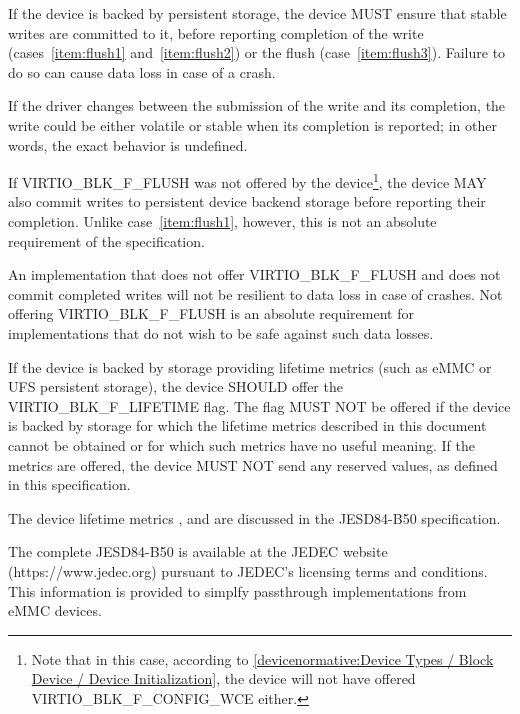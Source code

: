 If the device is backed by persistent storage, the device MUST ensure that
stable writes are committed to it, before reporting completion of the write
(cases~\ref{item:flush1} and~\ref{item:flush2}) or the flush
(case~\ref{item:flush3}).  Failure to do so can cause data loss
in case of a crash.

If the driver changes  between the submission of the write
and its completion, the write could be either volatile or stable when
its completion is reported; in other words, the exact behavior is undefined.

%

If VIRTIO_BLK_F_FLUSH was not offered by the
  device\footnote{Note that in this case, according to
  \ref{devicenormative:Device Types / Block Device / Device Initialization},
  the device will not have offered VIRTIO_BLK_F_CONFIG_WCE either.}, the
device MAY also commit writes to persistent device backend storage before
reporting their completion.  Unlike case~\ref{item:flush1}, however, this
is not an absolute requirement of the specification.

\begin{note}
  An implementation that does not offer VIRTIO_BLK_F_FLUSH and does not commit
  completed writes will not be resilient to data loss in case of crashes.
  Not offering VIRTIO_BLK_F_FLUSH is an absolute requirement
  for implementations that do not wish to be safe against such data losses.
\end{note}

If the device is backed by storage providing lifetime metrics (such as eMMC
or UFS persistent storage), the device SHOULD offer the VIRTIO_BLK_F_LIFETIME
flag. The flag MUST NOT be offered if the device is backed by storage for which
the lifetime metrics described in this document cannot be obtained or for which
such metrics have no useful meaning. If the metrics are offered, the device MUST NOT
send any reserved values, as defined in this specification.

\begin{note}
  The device lifetime metrics , 
  and  are discussed in the JESD84-B50 specification.

  The complete JESD84-B50 is available at the JEDEC website (https://www.jedec.org)
  pursuant to JEDEC's licensing terms and conditions. This information is provided to
  simplfy passthrough implementations from eMMC devices.
\end{note}


